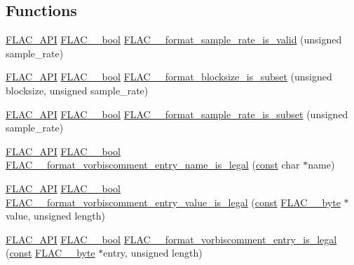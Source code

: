 \subsection*{Functions}
\begin{DoxyCompactItemize}
\item 
\hyperlink{group__flac__export_ga56ca07df8a23310707732b1c0007d6f5}{F\+L\+A\+C\+\_\+\+A\+PI} \hyperlink{ordinals_8h_a95103469f1cbd78b8cf250194985b34e}{F\+L\+A\+C\+\_\+\+\_\+bool} \hyperlink{group__flac__format_gaec1c46afe33c0bb200be68bb36e0dd32}{F\+L\+A\+C\+\_\+\+\_\+format\+\_\+sample\+\_\+rate\+\_\+is\+\_\+valid} (unsigned sample\+\_\+rate)
\item 
\hyperlink{group__flac__export_ga56ca07df8a23310707732b1c0007d6f5}{F\+L\+A\+C\+\_\+\+A\+PI} \hyperlink{ordinals_8h_a95103469f1cbd78b8cf250194985b34e}{F\+L\+A\+C\+\_\+\+\_\+bool} \hyperlink{group__flac__format_gacc6258efc7b737f90ee0c32bdb6775ba}{F\+L\+A\+C\+\_\+\+\_\+format\+\_\+blocksize\+\_\+is\+\_\+subset} (unsigned blocksize, unsigned sample\+\_\+rate)
\item 
\hyperlink{group__flac__export_ga56ca07df8a23310707732b1c0007d6f5}{F\+L\+A\+C\+\_\+\+A\+PI} \hyperlink{ordinals_8h_a95103469f1cbd78b8cf250194985b34e}{F\+L\+A\+C\+\_\+\+\_\+bool} \hyperlink{group__flac__format_ga996f8732a2502ad79a68bb4a9f945235}{F\+L\+A\+C\+\_\+\+\_\+format\+\_\+sample\+\_\+rate\+\_\+is\+\_\+subset} (unsigned sample\+\_\+rate)
\item 
\hyperlink{group__flac__export_ga56ca07df8a23310707732b1c0007d6f5}{F\+L\+A\+C\+\_\+\+A\+PI} \hyperlink{ordinals_8h_a95103469f1cbd78b8cf250194985b34e}{F\+L\+A\+C\+\_\+\+\_\+bool} \hyperlink{group__flac__format_ga14980d2e4b0ff2cdd4f22fcf8e75b54c}{F\+L\+A\+C\+\_\+\+\_\+format\+\_\+vorbiscomment\+\_\+entry\+\_\+name\+\_\+is\+\_\+legal} (\hyperlink{zconf_8h_a2c212835823e3c54a8ab6d95c652660e}{const} char $\ast$name)
\item 
\hyperlink{group__flac__export_ga56ca07df8a23310707732b1c0007d6f5}{F\+L\+A\+C\+\_\+\+A\+PI} \hyperlink{ordinals_8h_a95103469f1cbd78b8cf250194985b34e}{F\+L\+A\+C\+\_\+\+\_\+bool} \hyperlink{group__flac__format_gae0707c9d46b2af02f1e145bdae331605}{F\+L\+A\+C\+\_\+\+\_\+format\+\_\+vorbiscomment\+\_\+entry\+\_\+value\+\_\+is\+\_\+legal} (\hyperlink{zconf_8h_a2c212835823e3c54a8ab6d95c652660e}{const} \hyperlink{ordinals_8h_a5eb569b12d5b047cdacada4d57924ee3}{F\+L\+A\+C\+\_\+\+\_\+byte} $\ast$value, unsigned length)
\item 
\hyperlink{group__flac__export_ga56ca07df8a23310707732b1c0007d6f5}{F\+L\+A\+C\+\_\+\+A\+PI} \hyperlink{ordinals_8h_a95103469f1cbd78b8cf250194985b34e}{F\+L\+A\+C\+\_\+\+\_\+bool} \hyperlink{group__flac__format_ga6878e238052fc0f7109b55129d64b4e5}{F\+L\+A\+C\+\_\+\+\_\+format\+\_\+vorbiscomment\+\_\+entry\+\_\+is\+\_\+legal} (\hyperlink{zconf_8h_a2c212835823e3c54a8ab6d95c652660e}{const} \hyperlink{ordinals_8h_a5eb569b12d5b047cdacada4d57924ee3}{F\+L\+A\+C\+\_\+\+\_\+byte} $\ast$entry, unsigned length)

\end{DoxyCompactItemize}
